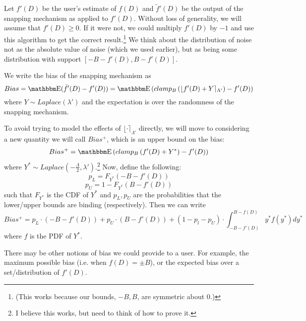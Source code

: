 \documentclass[11pt]{scrartcl} %
\begin{document}
Let $f'(D)$ be the user's estimate of $f(D)$ and $\tilde{f}'(D)$ be the output of the snapping mechanism as applied to
$f'(D)$. Without loss of generality, we will assume that $f'(D) \geq 0$. If it were not, we could
multiply $f'(D)$ by $-1$ and use this algorithm to get the correct result.\footnote{(This works because our bounds, $-B, B$, are symmetric about $0$.)}
We think about the distribution of noise not as the absolute value of noise (which we used earlier), but as
being some distribution with support $[-B - f'(D), B - f'(D)]$. \newline

We write the bias of the snapping mechanism as
\[ Bias = \E(\tilde{f}'(D) - f'(D)) = \E\left( clamp_B\left( \lfloor f'(D) + Y \rceil_{\Lambda'} \right) - f'(D) \right) \]
where $Y \sim Laplace(\lambda')$ and the expectation is over the randomness of the snapping mechanism. \newline

To avoid trying to model the effects of $\lfloor \cdot \rceil_{\Lambda'}$ directly, we will move to considering
a new quantity we will call $Bias^{+}$, which is an upper bound on the bias:
\[ Bias^{+} = \E\left( clamp_B\left( f'(D) + Y^{*} \right) - f'(D) \right) \]
where $Y^{*} \sim Laplace(-\frac{\Lambda}{2}, \lambda')$.\footnote{I believe this works,
but need to think of how to prove it.} Now, define the following:
\[ p_L = F_{Y^*}(-B - f'(D)) \]
\[ p_U = 1 - F_{Y^*}(B - f'(D)) \]
such that $F_{Y^*}$ is the CDF of $Y^*$ and $p_L, p_U$ are the probabilities that the lower/upper bounds are binding (respectively).
Then we can write
\[ Bias^+ = p_L \cdot (-B - f'(D)) + p_U \cdot (B - f'(D)) + (1-p_l-p_U) \cdot \int_{-B-f'(D)}^{B-f(D)}y^* f(y^*) dy^* \]
where $f$ is the PDF of $Y^*$. \newline

There may be other notions of bias we could provide to a user. For example, the maximum possible bias
(i.e. when $f(D) = \pm B$), or the expected bias over a set/distribution of $f'(D)$.
\end{document}
